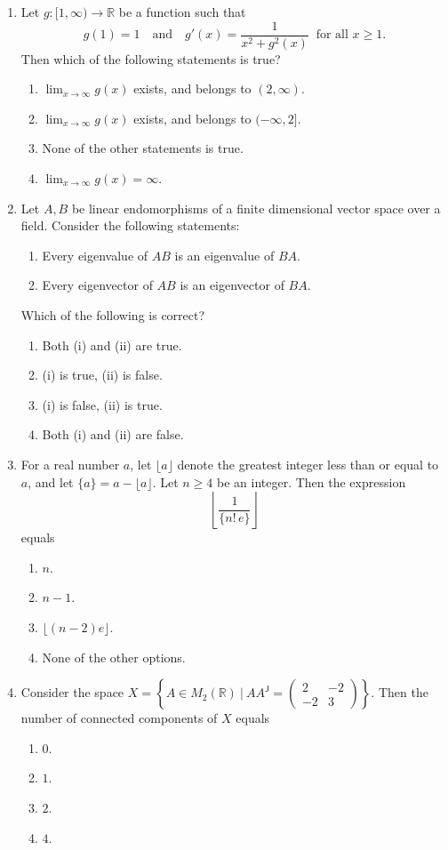 \documentclass[11pt, a4paper]{article}
\begin{document}
\begin{enumerate}
\item Let $g:[1,\infty)\to\mathbb{R}$ be a function such that
\[ g(1)=1\quad\text{and}\quad g'(x)=\frac{1}{x^2+g^2(x)}\ \text{ for all } x\ge1. \]
Then which of the following statements is true?
\begin{enumerate}[label=(\alph*)]
\item $\lim_{x\to\infty}g(x)$ exists, and belongs to $(2,\infty)$.
\item $\lim_{x\to\infty}g(x)$ exists, and belongs to $(-\infty,2]$.
\item None of the other statements is true.
\item $\lim_{x\to\infty}g(x)=\infty$.
\end{enumerate}

\item Let $A,B$ be linear endomorphisms of a finite dimensional vector space over a field. Consider the following statements:
\begin{enumerate}[label=(\roman*)]
\item Every eigenvalue of $AB$ is an eigenvalue of $BA$.
\item Every eigenvector of $AB$ is an eigenvector of $BA$.
\end{enumerate}
Which of the following is correct?
\begin{enumerate}[label=(\alph*)]
\item Both (i) and (ii) are true.
\item (i) is true, (ii) is false.
\item (i) is false, (ii) is true.
\item Both (i) and (ii) are false.
\end{enumerate}

\item For a real number $a$, let $\lfloor a\rfloor$ denote the greatest integer less than or equal to $a$, and let $\{a\}=a-\lfloor a\rfloor$. Let $n\ge4$ be an integer. Then the expression
\[ \left\lfloor\frac{1}{\{n!\,e\}}\right\rfloor \]
equals
\begin{enumerate}[label=(\alph*)]
\item $n$.
\item $n-1$.
\item $\lfloor(n-2)e\rfloor$.
\item None of the other options.
\end{enumerate}


\item Consider the space $X=\left\{A\in M_2(\mathbb{R})\ \Big|\ AA^{\mathsf J}=\begin{pmatrix}2&-2\\-2&3\end{pmatrix}\right\}$. Then the number of connected components of $X$ equals
\begin{enumerate}[label=(\alph*)]
\item $0$. \item $1$. \item $2$. \item $4$.
\end{enumerate}


\end{enumerate}
\end{document}
